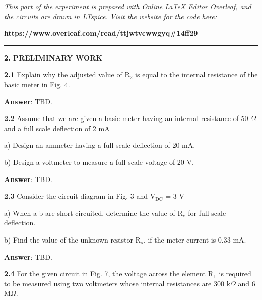 \documentclass{article}
\begin{document}
\large

{\textit{This part of the experiment is prepared with Online LaTeX Editor Overleaf, and the circuits are drawn in LTspice. Visit the website for the code here:}}

{\textbf{https://www.overleaf.com/read/ttjwtvcwwgyq\#14ff29}}
\vspace{4mm}
\hrule
\vspace{4mm}
{\Large \textbf{2. PRELIMINARY WORK}}

\vspace{4mm}

{\textbf{2.1} Explain why the adjusted value of $\text{R}_2$ is equal to the internal resistance of the basic meter in Fig. 4.}

\vspace{4mm}

{\textbf{Answer}: TBD.}

\vspace{8mm}

{\textbf{2.2} Assume that we are given a basic meter having an internal resistance of 50 $\Omega$ and a full scale deflection of 2 mA}

{\quad a) Design an ammeter having a full scale deflection of 20 mA.}

{\quad b) Design a voltmeter to measure a full scale voltage of 20 V.}

\vspace{4mm}

{\textbf{Answer}: TBD.}

\vspace{8mm}

{\textbf{2.3} Consider the circuit diagram in Fig. 3 and $\text{V}_{\text{DC}}$ = 3 V}

{\quad a) When a-b are short-circuited, determine the value of $\text{R}_\text{v}$ for full-scale deflection.}

{\quad b) Find the value of the unknown resistor $\text{R}_\text{x}$, if the meter current is 0.33 mA.}

\vspace{4mm}

{\textbf{Answer}: TBD.}

\vspace{8mm}

{\textbf{2.4} For the given circuit in Fig. 7, the voltage across the element $\text{R}_{\text{L}}$ is required to be 
measured using two voltmeters whose internal resistances are 300 k$\Omega$ and 6 M$\Omega$.}
\end{document}
